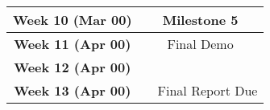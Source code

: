 \documentclass[11pt]{article}
\begin{document}
\begin{center}
\begin{tabular}{|c|c|c|c|}
    \hline
    \textbf{Week 10 (Mar 00)} & & Milestone 5 & \\
    
    \hline
    \textbf{Week 11 (Apr 00)} & & Final Demo & \\
    
    \hline
    \textbf{Week 12 (Apr 00)} & & & \\
    
    \hline
    \textbf{Week 13 (Apr 00)} & & \multicolumn{2}{c|}{Final Report Due} \\
    
    \hline
\end{tabular}

\end{center}



\end{document}
